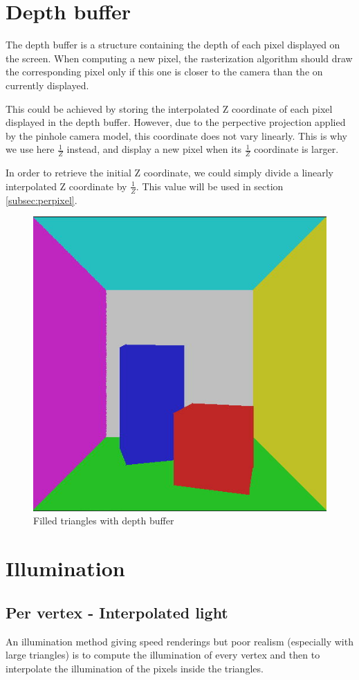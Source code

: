 \section{Depth buffer}

The depth buffer is a structure containing the depth of each pixel displayed on the screen. When computing a new pixel, the rasterization algorithm should draw the corresponding pixel only if this one is closer to the camera than the on currently displayed.

This could be achieved by storing the interpolated Z coordinate of each pixel displayed in the depth buffer. However, due to the perpective projection applied by the pinhole camera model, this coordinate does not vary linearly. This is why we use here $\frac{1}{Z}$ instead, and display a new pixel when its $\frac{1}{Z}$ coordinate is larger.

In order to retrieve the initial Z coordinate, we could simply divide a linearly interpolated Z coordinate by $\frac{1}{Z}$. This value will be used in section \ref{subsec:perpixel}.

\begin{figure}[H]
\centering
\includegraphics[width=0.4\linewidth]{img/depth_buffer.jpg}
\caption{Filled triangles with depth buffer}
\end{figure}



\section{Illumination}
\subsection{Per vertex - Interpolated light}
An illumination method giving speed renderings but poor realism (especially with large triangles) is to compute the illumination of every vertex and then to interpolate the illumination of the pixels inside the triangles.

